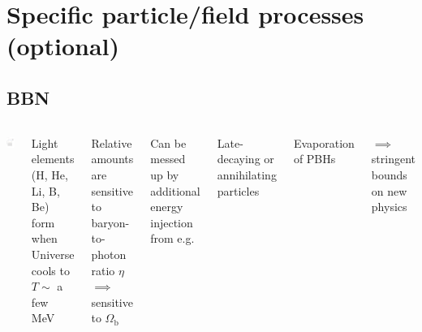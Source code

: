 \documentclass[xcolor=dvipsnames]{beamer}
\begin{document}
\section[Specific particle/field processes]{Specific particle/field processes \bf (optional)}


\subsection{BBN}


  \begin{columns}
    \includegraphics[height=0.9\columnwidth]{bbn}
    \bi
      \item Light elements (H, He, Li, B, Be) form when Universe cools to $T \sim$ a few MeV
      \item Relative amounts are sensitive to baryon-to-photon ratio $\eta$\\
            $\implies$ sensitive to $\Omega_\mathrm{b}$
      \item Can be messed up by additional energy injection from e.g.\bi
        \footnotesize
        \item Late-decaying or annihilating particles
        \item Evaporation of PBHs
      \ei
      \item[$\implies$] stringent bounds on new physics 
    \ei
  \end{columns}
\end{document}
